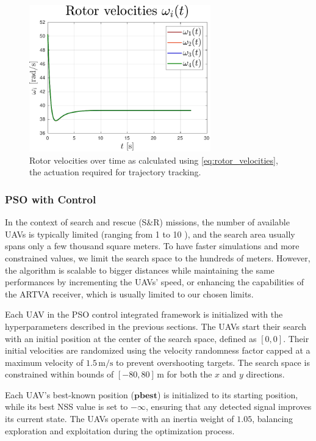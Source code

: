 \documentclass[main]{subfiles}
\begin{document}
\begin{figure}
    \centering
    \includegraphics[width=0.7\textwidth]{images/rotor_velocities.pdf}
    \caption[Rotor Velocities]{Rotor velocities over time as calculated using \eqref{eq:rotor_velocities}, the actuation required for trajectory tracking.}
    \label{fig:rotor_velocities}
\end{figure}

\newpage
\subsubsection{PSO with Control}
In the context of search and rescue (S\&R) missions, the number of available 
UAVs is typically limited (ranging from 1 to 10 \cite{PSO_original}), and 
the search area 
usually spans only a few thousand square meters.
To have faster simulations and more constrained 
values, we limit the search space 
to the hundreds of meters.
However, the algorithm is scalable to bigger distances while maintaining the same
performances by incrementing the UAVs' speed, or enhancing the capabilities
of the ARTVA receiver, which is usually limited to our chosen limits.

Each UAV in the PSO control integrated framework is 
initialized with the hyperparameters described in the previous sections. 
The UAVs start their search with an initial position at the 
center of the search space, defined as \([0, 0]\). 
Their initial velocities are randomized using the velocity randomness
factor capped at a maximum velocity of \(1.5 \, \text{m/s}\) 
to prevent overshooting targets. The search space is constrained within bounds 
of \([-80, 80] \, \text{m}\) for both the \(x\) and \(y\) directions.

Each UAV's best-known position ($\mathbf{pbest}$) is initialized 
to its starting position, while its best NSS
value is set to \(-\infty\), ensuring that any detected signal improves 
its current state. The UAVs operate with an inertia weight of \(1.05\), 
balancing exploration and exploitation during the optimization process. 
\end{document}
